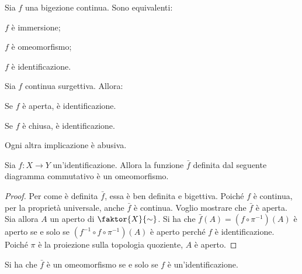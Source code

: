 \begin{oss}
    Sia $f$ una bigezione continua. Sono equivalenti:
    \begin{nlist}
        \item $f$ \`e immersione;
        \item $f$ \`e omeomorfismo;
        \item $f$ \`e identificazione.
    \end{nlist}
\end{oss}

\begin{oss}
    Sia $f$ continua surgettiva. Allora:
    \begin{nlist}
        \item Se $f$ \`e aperta, \`e identificazione.
        \item Se $f$ \`e chiusa, \`e identificazione.
        \item Ogni altra implicazione \`e abusiva.
    \end{nlist}
\end{oss}

\begin{prop}
    Sia $f\colon X \longrightarrow Y$ un'identificazione. Allora la funzione $\bar{f}$ definita dal seguente diagramma commutativo \`e un omeomorfismo.

    \begin{center}
    \end{center}
\end{prop}
\begin{proof}
    Per come \`e definita $\bar{f}$, essa \`e ben definita e bigettiva. Poich\'e $f$ \`e continua, per la propriet\`a universale, anche $\bar{f}$ \`e continua. Voglio mostrare che $\bar{f}$ \`e aperta. Sia allora $A$ un aperto di $\faktor{X}{\sim}$. Si ha che $\bar{f}(A)=(f\circ \pi^{-1})(A)$ \`e aperto se e solo se ${ (f^{-1} \circ f \circ \pi ^{-1})(A)}$ \`e aperto perch\'e $f$ \`e identificazione. Poich\'e $\pi$ \`e la proiezione sulla topologia quoziente, $A$ \`e aperto.
\end{proof}

\begin{oss}
    Si ha che $\bar{f}$ \`e un omeomorfismo se e solo se $f$ \`e un'identificazione.
\end{oss}


